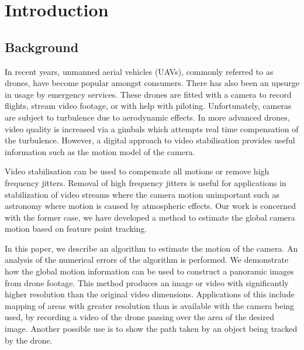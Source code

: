 \section{Introduction}
\subsection{Background}
In recent years, unmanned aerial vehicles (UAVs),
commonly referred to as drones,
have become popular amongst consumers.
There has also been an upsurge in usage by emergency services.
These drones are fitted with a camera to record flights, stream video footage, or with help with piloting.
Unfortunately, cameras are subject to turbulence due to aerodynamic effects. 
In more advanced drones, video quality is increased via a gimbals which attempts real time compensation of the turbulence.
However, a digital approach to video stabilisation provides useful information such as the motion model of the camera.

Video stabilisation can be used to compensate all motions or remove high frequency jitters.
Removal of high frequency jitters is useful for applications in stabilization of video streams
where the camera motion unimportant such as astronomy where motion is caused by atmospheric effects. 
Our work is concerned with the former case,
we have developed a method to estimate the global camera motion based on feature point tracking.

In this paper, we describe an algorithm to estimate the motion of the camera.
An analysis of the numerical errors of the algorithm is performed.
We demonstrate how the global motion information can be used to construct a panoramic images from drone footage.
This method produces an image or video with significantly higher resolution than the original video dimensions. 
Applications of this include mapping of areas with greater resolution than is available with the camera being used, by recording a video of the drone passing over the area of the desired image.
Another possible use is to show the path taken by an object being tracked by the drone.

